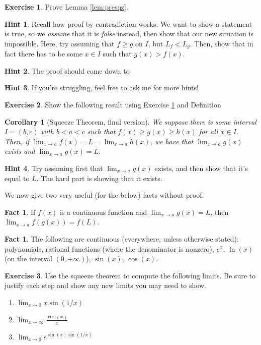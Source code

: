 \documentclass[english]{book}
\newtheorem{corollary}[theorem]{Corollary}
\theoremstyle{remark}
\theoremstyle{definition}
\newtheorem{excs}{Exercise}[chapter]
\newtheorem{hint}{Hint}[excs]
\newtheorem*{next week}{Next Week}
\newtheorem{fact}[theorem]{Fact}
\newcommand{\dlim}{\displaystyle\lim}
\begin{document}
\begin{excs}\label{excs:presqz}
Prove Lemma \ref{lem:presqz}.
\end{excs}
\begin{hint}
	Recall how proof by contradiction works. We want to show a statement is true, so we \emph{assume} that it is \emph{false} instead, then show that our new situation is impossible. Here, try assuming that $f\geq g$ on $I$, but $L_f<L_g$. Then, show that in fact there has to be some $x\in I$ such that $g(x)>f(x)$.
\end{hint}
\begin{hint}
The proof should come down to 
\end{hint}
\begin{hint}
	If you're struggling, feel free to ask me for more hints!
\end{hint}
\begin{excs}\label{excs:sqz}
	Show the following result using Exercise \ref{excs:presqz} and Definition
	\begin{corollary}[Squeeze Theorem, final version]\label{cor:finalsqz}
		We suppose there is some interval $I=(b,c)$ with $b<a<c$ such that $f(x)\geq g(x)\geq h(x)$ for all $x\in I$. Then, if $\lim_{x\to a}f(x)=L=\lim_{x\to a}h(x)$, we have that $\lim_{x\to a}g(x)$ exists and $\lim_{x\to a}g(x)=L$.
	\end{corollary}
\begin{hint}
Try assuming first that $\lim_{x\to a}g(x)$ exists, and then show that it's equal to $L$. The hard part is showing that it exists.
\end{hint}\end{excs}
We now give two very useful (for the below) facts without proof.
\begin{fact}
	If $f(x)$ is a continuous function and $\dlim_{x\to a}g(x)=L$, then $\dlim_{x\to a}f(g(x))=f(L)$.
\end{fact}
\begin{fact}
	The following are continuous (everywhere, unless otherwise stated): polynomials, rational functions (where the denominator is nonzero), $e^x$, $\ln(x)$ (on the interval $(0,+\infty)$), $\sin(x)$, $\cos(x)$. 
\end{fact}
\begin{excs}
	Use the squeeze theorem to compute the following limits. Be sure to justify each step and show any new limits you may need to show. \begin{enumerate}[label=\textit{(\alph*)}]
		\item $\dlim_{x\to 0}{x\sin(1/x)}$
		\item $\dlim_{x\to \infty} \frac{\cos(x)}{x}$
		\item $\dlim_{x\to 0} e^{\sin(x)\sin(1/x)}$
		
	\end{enumerate}
\end{excs}
\end{document}
